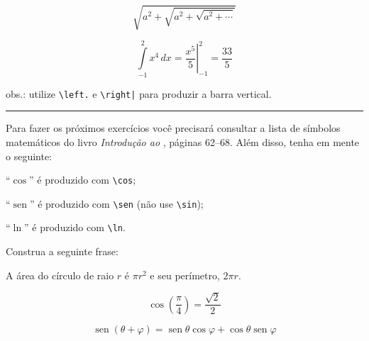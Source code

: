 \documentclass[a4paper,10pt,twocolumn,landscape]{article}
\DeclareMathOperator{\sen}{sen}
\begin{document}
	
	\begin{exercicio}
	
		\[
		\sqrt{a^2 + \sqrt{a^2 + \sqrt{a^2 + \cdots}}}
		\]
	\end{exercicio}
	
	
	\begin{exercicio}	
	
		\[
		\int\limits_{-1}^2 x^4\, dx = \left.\frac{x^5}{5}\right|_{-1}^2 = \frac{33}{5}
		\]
	
	\bigskip		
	\noindent	obs.: utilize \verb|\left.| e \verb!\right|! para produzir a barra vertical.
	\end{exercicio}


	
	\rule{0.5\columnwidth}{0.1pt}\hspace*{\stretch{1}}
	\medskip

	Para fazer os próximos exercícios você precisará consultar a lista de símbolos matemáticos do livro \textit{Introdução ao \LaTeXe}, páginas 62--68. Além disso, tenha em mente o seguinte:
	\begin{compactitem}
		\item ``\(\cos\)'' é produzido com \verb|\cos|;
		\item ``\(\sen\)'' é produzido com \verb|\sen| (não use \verb|\sin|);
		\item ``\(\ln\)'' é produzido com \verb|\ln|.
	\end{compactitem}

	\bigskip
	\begin{exercicio} Construa a seguinte frase:
	
		\centering A área do círculo de raio \(r\) é \(\pi r^2\) e seu perímetro, \(2\pi r\).
	\end{exercicio}
	
	
	\begin{exercicio}\label{ex:cos}
	
		\[
		\cos\left(\frac{\pi}{4}\right) = \frac{\sqrt{2}}{2}
		\]
	\end{exercicio}
	

	\begin{exercicio}\label{ex:sin}
	
		\begin{equation}\label{eq:sen(A+B)}
		\sen\left(\theta+\varphi\right) = \sen\theta \cos\varphi + \cos\theta \sen\varphi
		\end{equation}
	\end{exercicio}
	
\end{document}
